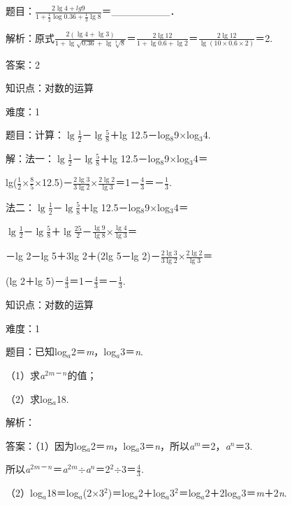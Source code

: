 \documentclass{article} %
\begin{document}
题目：$\frac{2\lg4+lg9}{1+\frac{1}{2}\log0.36+\frac{1}{3}\lg8}$＝\_\_\_\_\_\_\_\_．

解析：原式$\frac{2(\lg4+\lg3)}{1+\lg\sqrt{0.36}+\lg\sqrt[3]{8}}$＝$\frac{2\lg12}{1+\lg0.6+\lg2}$＝$\frac{2\lg12}{\lg(10\times0.6\times2)}$＝2.

答案：2

知识点：对数的运算

难度：1

题目：计算：$\lg\frac{1}{2}$－$\lg\frac{5}{8}$＋lg 12.5－log${}_{8}$9$\mathrm{\times}$log${}_{3}$4.

解：法一：$\lg\frac{1}{2}$－$\lg\frac{5}{8}$＋lg 12.5－log${}_{8}$9$\mathrm{\times}$log${}_{3}$4＝

lg($\frac{1}{2}$$\mathrm{\times}$$\frac{8}{5}$$\mathrm{\times}$12.5)－$\frac{2\lg3}{3\lg2}$$\mathrm{\times}$$\frac{2\lg2}{\lg3}$＝1－$\frac{4}{3}$＝－$\frac{1}{3}$.

法二：$\lg\frac{1}{2}$－$\lg\frac{5}{8}$＋lg 12.5－log${}_{8}$9$\mathrm{\times}$log${}_{3}$4＝

$\lg\frac{1}{2}$－$\lg\frac{5}{8}$＋$\lg\frac{25}{2}$－$\frac{\lg9}{\lg8}$$\mathrm{\times}$$\frac{\lg4}{\lg3}$＝

－lg 2－lg 5＋3lg 2＋(2lg 5－lg 2)－$\frac{2\lg3}{3\lg2}$$\mathrm{\times}$$\frac{2\lg2}{\lg3}$＝

(lg 2＋lg 5)－$\frac{4}{3}$＝1－$\frac{4}{3}$＝－$\frac{1}{3}$.

知识点：对数的运算

难度：1

题目：已知log\textit{${}_{a}$}2＝\textit{m}，log\textit{${}_{a}$}3＝\textit{n}.

（1）求\textit{a}${}^{2}$\textit{${}^{m}$}${}^{\textrm{－}}$\textit{${}^{n}$}的值；

（2）求log\textit{${}_{a}$}18.

解析：

答案：（1）因为log\textit{${}_{a}$}2＝\textit{m}，log\textit{${}_{a}$}3＝\textit{n}，所以\textit{a${}^{m}$}＝2，\textit{a${}^{n}$}＝3.

所以\textit{a}${}^{2}$\textit{${}^{m}$}${}^{\textrm{－}}$\textit{${}^{n}$}＝\textit{a}${}^{2}$\textit{${}^{m}$}$\mathrm{\div}$\textit{a${}^{n}$}＝2${}^{2}$$\mathrm{\div}$3＝$\frac{4}{3}$.

（2）log\textit{${}_{a}$}18＝log\textit{${}_{a}$}(2$\mathrm{\times}$3${}^{2}$)＝log\textit{${}_{a}$}2＋log\textit{${}_{a}$}3${}^{2}$＝log\textit{${}_{a}$}2＋2log\textit{${}_{a}$}3＝\textit{m}＋2\textit{n}.
\end{document}
